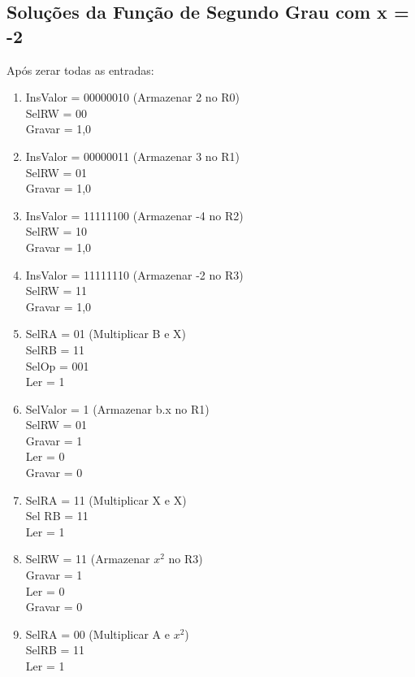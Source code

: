 \documentclass[]{article}
\begin{document}
	\subsection{Soluções da Função de Segundo Grau com x = -2}
		Após zerar todas as entradas:
		\begin{enumerate}
			\item InsValor = 00000010 (Armazenar 2 no R0)
			\\ SelRW = 00
			\\ Gravar = 1,0
			
			\item InsValor = 00000011 (Armazenar 3 no R1)
			\\ SelRW = 01
			\\ Gravar = 1,0
			
			\item InsValor = 11111100 (Armazenar -4 no R2)
			\\ SelRW = 10
			\\ Gravar = 1,0
			
			\item InsValor = 11111110 (Armazenar -2 no R3)
			\\ SelRW = 11
			\\ Gravar = 1,0
			
			\item SelRA = 01 (Multiplicar B e X)
			\\ SelRB = 11
			\\ SelOp = 001
			\\ Ler = 1
			
			\item SelValor = 1 (Armazenar b.x no R1)
			\\ SelRW = 01
			\\ Gravar = 1
			\\ Ler = 0
			\\ Gravar = 0
			
			\item SelRA = 11 (Multiplicar X e X)
			\\ Sel RB = 11
			\\ Ler = 1
			
			\item SelRW = 11 (Armazenar $x^2$ no R3)
			\\ Gravar = 1
			\\ Ler = 0
			\\ Gravar = 0
			
			\item SelRA = 00 (Multiplicar A e $x^2$)
			\\ SelRB = 11
			\\ Ler = 1
			

\end{enumerate}
\end{document}
